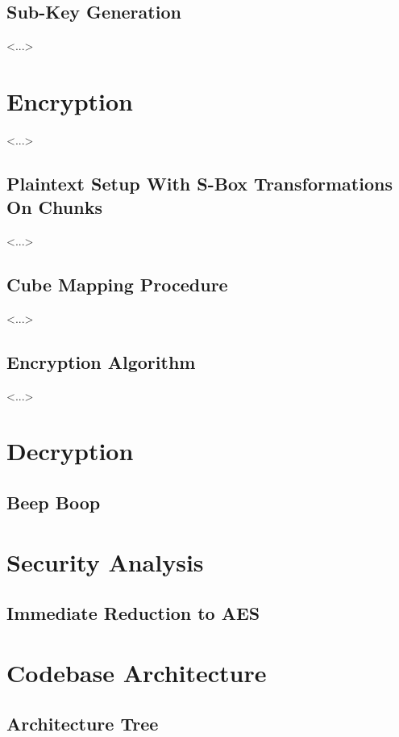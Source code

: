 \documentclass[12pt]{article}
\begin{document}
\subsection{Sub-Key Generation}
<...>

\section{Encryption}
<...>

\subsection{Plaintext Setup With S-Box Transformations On Chunks}
<...>

\subsection{Cube Mapping Procedure}
<...>

\subsection{Encryption Algorithm}
<...>

\section{Decryption}

\subsection{Beep Boop}

\section{Security Analysis}

\subsection{Immediate Reduction to AES}

\section{Codebase Architecture}

\subsection{Architecture Tree}
\end{document}

